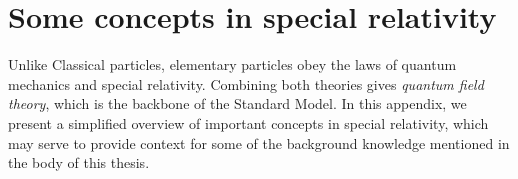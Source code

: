 


\chapter{Some concepts in special relativity}
\label{sec.relativity}
Unlike Classical particles, elementary particles obey the laws of quantum mechanics and special relativity. Combining both theories gives {\it quantum field theory}, which is the backbone of the Standard Model. In this appendix, we present a simplified overview of important concepts in special relativity, which may serve to provide context for some of the background knowledge mentioned in the body of this thesis.

